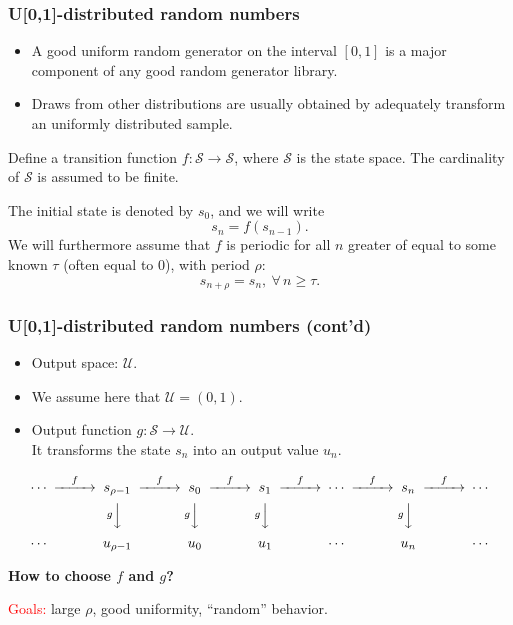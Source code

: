 \documentclass{beamer}
\begin{document}
	\begin{frame}
		\frametitle{U[0,1]-distributed random numbers}
		
		\begin{itemize}
			\item
			A good uniform random generator on the interval $[0,1]$ is a major
			component of any good random generator library.
			\item
			Draws from other distributions are usually obtained by adequately transform an
			uniformly distributed sample.
		\end{itemize}
		
		\mbox{}
		
		Define a {\blue transition function} $f: \mathcal{S} \rightarrow \mathcal{S}$,
		where $\mathcal{S}$ is the {\blue state space}.
		The cardinality of $\mathcal{S}$ is assumed to be finite.
		
		\mbox{}
		
		The initial state is denoted by $s_0$, and we will write
		\[
		s_n = f(s_{n-1}).
		\]
		We will furthermore assume that $f$ is periodic for all $n$ greater of
		equal to some known $\tau$ (often equal to 0), with period $\rho$:
		$$
		s_{n+\rho} = s_n,\ \forall\, n\ge\tau.
		$$
		
	\end{frame}
	
	\begin{frame}
		\frametitle{U[0,1]-distributed random numbers (cont'd)}
		
		\begin{itemize}
			\item
			Output space: $\mathcal{U}$.
			\item
			We assume here that $\mathcal{U} = (0,1)$.
			\item
			Output function $g: \mathcal{S} \rightarrow \mathcal{U}$.\\
			It transforms the state $s_n$ into an output value $u_n$.
		\end{itemize}
		
		\begin{small}
			\[
			\begin{CD}
				\cdots @>f>> s_{\rho-1} @>f>> s_0 @>f>> s_1  @>f>> 
				\cdots @>f>> s_n @>f>> \cdots \\ 
				@. @V{g}VV  @V{g}VV   @V{g}VV   
				@.  @V{g}VV  \\
				\cdots @. u_{\rho-1} @. u_0
				@.  u_1  @.   \cdots @.  u_n @.  \cdots \\
			\end{CD}
			\]
			\label{fig:rng}
		\end{small}
		
		\mbox{}
		
		{\bf How to choose $f$ and $g$?}
		
		\mbox{}
		
		\textcolor{red}{Goals:} large $\rho$, good uniformity, ``random'' behavior.
		
	\end{frame}
	
\end{document}
